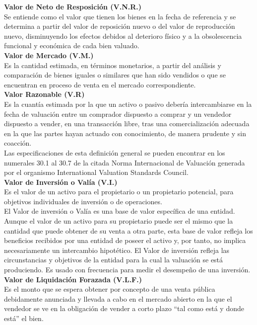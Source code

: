 \textbf{Valor de Neto de Resposición (V.N.R.)} \\ 
Se entiende como el valor que tienen los bienes en la fecha de referencia y se determina a partir del valor de reposición nuevo o del valor de reproducción nuevo, disminuyendo los efectos debidos al deterioro físico y a la obsolescencia funcional y económica de cada bien valuado. \\[6mm] 
\textbf{Valor de Mercado (V.M.)} \\ 
Es la cantidad estimada, en términos monetarios, a partir del análisis y comparación de bienes iguales o similares que han sido vendidos o que se encuentran en proceso de venta en el mercado correspondiente. \\[6mm]
\textbf{Valor Razonable (V.R)} \\ 
Es la cuantía estimada por la que un activo o pasivo debería intercambiarse en la fecha de valuación entre un comprador dispuesto a comprar y un vendedor dispuesto a vender, en una transacción libre, tras una comercialización adecuada en la que las partes hayan actuado con conocimiento, de manera prudente y sin coacción. \\ 
Las especificaciones de esta definición general se pueden encontrar en los numerales 30.1 al 30.7 de la citada Norma Internacional de Valuación generada por el organismo International Valuation Standards Council. \\[6mm] 
\textbf{Valor de Inversión o Valía (V.I.)} \\ 
Es el valor de un activo para el propietario o un propietario potencial, para objetivos individuales de inversión o de operaciones. \\ 
El Valor de inversión o Valía es una base de valor específica de una entidad. 
Aunque el valor de un activo para su propietario puede ser el mismo que la cantidad que puede obtener de su venta a otra parte, esta base de valor refleja los beneficios recibidos por una entidad de poseer el activo y, por tanto, no implica necesariamente un intercambio hipotético. 
El Valor de inversión refleja las circunstancias y objetivos de la entidad para la cual la valuación se está produciendo. 
Es usado con frecuencia para medir el desempeño de una inversión. \\[6mm] 
\textbf{Valor de Liquidación Forazada (V.L.F.)} \\ 
Es el monto que se espera obtener por concepto de una venta pública debidamente anunciada y llevada a cabo en el mercado abierto en la que el vendedor se ve en la obligación de vender a corto plazo ``tal como está y donde está'' el bien. \\[6mm] 
